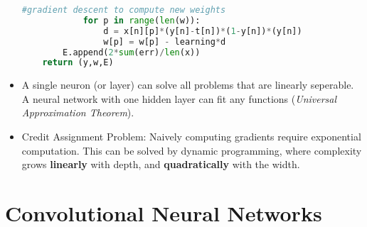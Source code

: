 \documentclass[a4paper]{article}
\numberwithin{equation}{section}
\begin{document}
\begin{itemize}
\begin{lstlisting}[language=Python]
            #gradient descent to compute new weights
            for p in range(len(w)):
                d = x[n][p]*(y[n]-t[n])*(1-y[n])*(y[n])
                w[p] = w[p] - learning*d
        E.append(2*sum(err)/len(x))
    return (y,w,E)
    \end{lstlisting}
    \item A single neuron (or layer) can solve all problems that are linearly seperable. A neural network with one hidden layer can fit any functions (\textit{Universal Approximation Theorem}).
    \item Credit Assignment Problem: Naively computing gradients require exponential computation. This can be solved by dynamic programming, where complexity grows \textbf{linearly} with depth, and \textbf{quadratically} with the width.    
\end{itemize}

\section{Convolutional Neural Networks}
\end{document}
